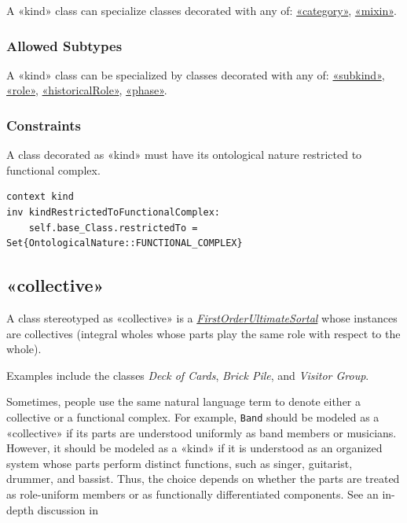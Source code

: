 A «kind» class can specialize classes decorated with any of: 
\hyperref[stereotype:category]{«category»}, \hyperref[stereotype:mixin]{«mixin»}.

\subsubsection{Allowed Subtypes}

A «kind» class can be specialized by classes decorated with any of:
\hyperref[stereotype:subkind]{«subkind»}, \hyperref[stereotype:role]{«role»}, \hyperref[stereotype:historicalRole]{«historicalRole»}, \hyperref[stereotype:phase]{«phase»}.

\subsubsection{Constraints}

\begin{constraint}
\label{kindRestrictedToFunctionalComplex}

A class decorated as «kind» must have its ontological nature restricted to functional complex.

\begin{lstlisting}[language=OCL]
context kind 
inv kindRestrictedToFunctionalComplex:
    self.base_Class.restrictedTo = Set{OntologicalNature::FUNCTIONAL_COMPLEX}
\end{lstlisting}
\end{constraint}

\subsection{«collective»}
\label{stereotype:collective}

A class stereotyped as «collective» is a \hyperref[stereotype:firstOrderUltimateSortal]{\textit{FirstOrderUltimateSortal}} whose instances are collectives (integral wholes whose parts play the same role with respect to the whole).

Examples include the classes \textit{Deck of Cards}, \textit{Brick Pile}, and \textit{Visitor Group}. 

Sometimes, people use the same natural language term to denote either a collective or a functional complex. For example, \texttt{Band} should be modeled as a «collective» if its parts are understood uniformly as band members or musicians. However, it should be modeled as a «kind» if it is understood as an organized system whose parts perform distinct functions, such as singer, guitarist, drummer, and bassist. Thus, the choice depends on whether the parts are treated as role-uniform members or as functionally differentiated components. See an in-depth discussion in \cite{sales2017fleet}

